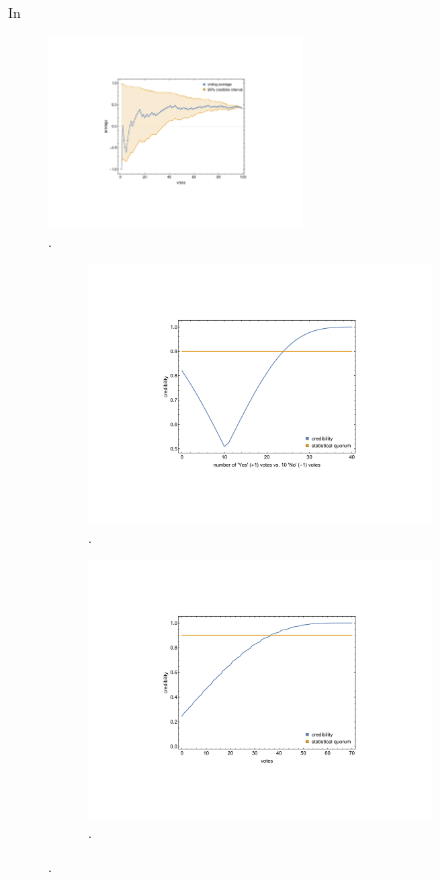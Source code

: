 \documentclass[format=acmsmall, review=true, screen=true, anonymous=true]{acmart}
\begin{document}
In
\begin{figure}[ht]
\centering
\includegraphics[width=0.6\textwidth]{figures/credible_interval.pdf}
\caption{.}
\label{fig:credible_interval}
\end{figure}

\begin{figure}[ht]
\centering
\begin{subfigure}{.5\textwidth}
\centering
\includegraphics[width=\textwidth]{figures/simple_majority.pdf}
\caption{.}
\label{fig:simple_majority}
\end{subfigure}%
\begin{subfigure}{.5\textwidth}
\centering
\includegraphics[width=\textwidth]{figures/competing_proposals.pdf}
\caption{.}
\label{fig:simple_majority}
\end{subfigure}
\end{figure}
\end{document}
